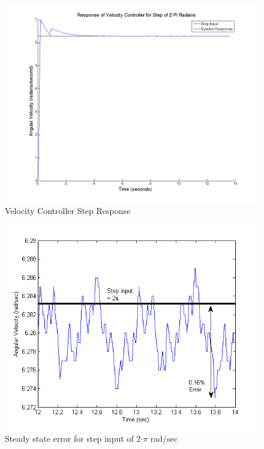 \documentclass{article}
\theoremstyle{plain}
\theoremstyle{definition}
\theoremstyle{remark}
\begin{document}
\begin{figure}[htb]
\begin{center}
\includegraphics[width = 12cm]{velstep2Pi.png}
\caption{Velocity Controller Step Response}
\label{q6_4}
\end{center}
\end{figure}

\begin{figure}[htb]
\begin{center}
\includegraphics[width = 12cm]{VelStepError.png}
\caption{Steady state error for step input of 2$\cdot\pi$ rad/sec}
\label{VelStepError}
\end{center}
\end{figure}
\end{document}
